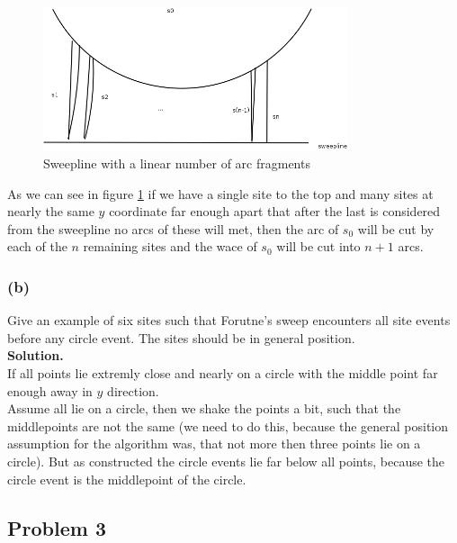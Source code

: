 \documentclass[11pt,a4paper,ngerman]{article}
\begin{document}
\begin{figure}[bt]
    \centering
    \includegraphics[width=0.8\textwidth]{media/p2ex1}
    \caption{Sweepline with a linear number of arc fragments}
    \label{alge:ueb9:linarcs}
\end{figure}

As we can see in figure \ref{alge:ueb9:linarcs} if we have a single site
to the top and many sites at nearly the same $y$ coordinate far enough apart
that after the last is considered from the sweepline no arcs of these will met,
then the arc of $s_0$ will be cut by each of the $n$ remaining sites and
the wace of $s_0$ will be cut into $n+1$ arcs.

\subsubsection*{(b)}

Give an example of six sites such that Forutne's sweep encounters all site
events before any circle event. The sites should be in general position.\\

\textbf{Solution.}\\

If all points lie extremly close and nearly on a circle with the middle point far enough away in $y$ direction.\\
Assume all lie on a circle, then we shake the points a bit, such that the middlepoints are not the same
(we need to do this, because the general position assumption for the algorithm was, that not more
then three points lie on a circle).
But as constructed the circle events lie far below all points, because the circle event is the middlepoint of the circle.

\vspace{5cm}

\subsection*{Problem 3}
\end{document}

